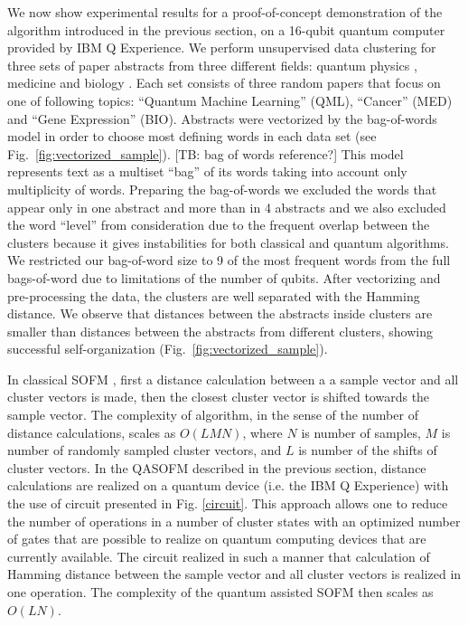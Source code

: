 \documentclass[pra,showkeys,twocolumn,showpacs]{revtex4-1}
\begin{document}
We now show experimental results for a proof-of-concept demonstration of the algorithm introduced in the previous section, on a 16-qubit quantum computer provided by IBM Q Experience.  
We perform unsupervised data clustering for three sets of paper abstracts from three different fields: quantum physics \cite{qml0, qml1, qml2}, medicine \cite{med0, med1, med2} and biology \cite{bio0, bio1, bio2}. Each set consists of three random papers that focus on one of following topics: ``Quantum Machine Learning'' (QML), ``Cancer'' (MED) and ``Gene Expression'' (BIO). Abstracts were vectorized by the bag-of-words model in order to choose most defining words in each data set (see Fig.~\ref{fig:vectorized_sample}). [TB: bag of words reference?]  This model represents text as a multiset ``bag'' of its words taking into account only multiplicity of words. Preparing the bag-of-words we excluded the words that appear only in one abstract and more than in 4 abstracts and we also excluded the word ``level'' from consideration due to the frequent overlap between the clusters because it gives instabilities for both classical and quantum algorithms. We restricted our bag-of-word size to 9 of the most frequent words from the full bags-of-word  due to limitations of the number of qubits. After vectorizing and pre-processing  the data, the clusters are well separated with the Hamming distance.  We observe that distances between the abstracts inside clusters are smaller than distances between the abstracts from different clusters, showing successful self-organization (Fig.~\ref{fig:vectorized_sample}). 


In classical SOFM \cite{kohonen1990}, first a distance calculation between a a sample vector and all cluster vectors is made, then the closest cluster vector is shifted towards the sample vector. The complexity of algorithm, in the sense of the number of distance calculations, scales as $O(LMN)$, where $N$ is number of samples, $M$ is number of randomly sampled cluster vectors, and $L$ is number of the shifts of cluster vectors.  In the QASOFM described in the previous section, distance calculations are realized on a quantum device (i.e. the IBM Q Experience) with the use of circuit presented in Fig. \ref{circuit}. This approach allows one to reduce the number of operations in a number of cluster states with an optimized number of gates that are possible to realize on  quantum computing devices that are currently available. The circuit realized in such a manner that calculation of Hamming distance between the sample vector and all cluster vectors is realized in one operation. The complexity of the quantum assisted SOFM then scales as $O(LN)$. 
\end{document}
